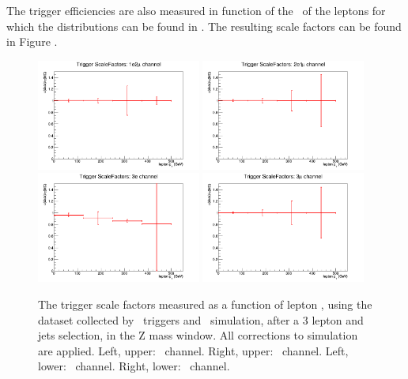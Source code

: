 The trigger efficiencies are also measured in function of the \pt\ of the leptons for which the distributions can be found in . The resulting scale factors  can be found in Figure .
\begin{figure}[htbp]
	\includegraphics[width=0.48\textwidth]{Appendix/Figures/trigger/Intext/SF_trigger_1e2muhistPt.png}
	\includegraphics[width=0.48\textwidth]{Appendix/Figures/trigger/Intext/SF_trigger_2e1muhistPt.png}
	\includegraphics[width=0.48\textwidth]{Appendix/Figures/trigger/Intext/SF_trigger_3ehistPt.png}
	\includegraphics[width=0.48\textwidth]{Appendix/Figures/trigger/Intext/SF_trigger_3muhistPt.png}
	
	\caption{The trigger scale factors measured as a function of lepton \pt, using the dataset collected by \Etmis\ triggers and \WZ\ simulation, after a 3 lepton and jets selection, in the Z mass window. All corrections to simulation are applied. Left, upper: \emumu\ channel. Right, upper: \eemu\ channel. Left, lower: \eee\ channel. Right, lower: \mumumu\ channel.}
	\label{image:FigurestriggerIntext}
\end{figure}
